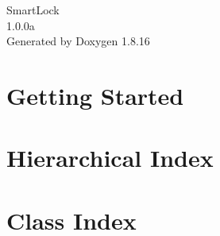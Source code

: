 \let\mypdfximage\pdfximage\def\pdfximage{\immediate\mypdfximage}\documentclass[twoside]{book}
\newcommand{\+}{\discretionary{\mbox{\scriptsize$\hookleftarrow$}}{}{}}
\newcommand{\clearemptydoublepage}{%
  \newpage{\pagestyle{empty}\cleardoublepage}%
}
\begin{document}
\hypersetup{pageanchor=false,
             bookmarksnumbered=true,
             pdfencoding=unicode
            }
\begin{titlepage}
\vspace*{7cm}
\begin{center}%
{\Large Smart\+Lock \\[1ex]\large 1.\+0.\+0a }\\
\vspace*{1cm}
{\large Generated by Doxygen 1.8.16}\\
\end{center}
\end{titlepage}
\clearemptydoublepage
{}
\tableofcontents
\clearemptydoublepage
{}
\hypersetup{pageanchor=true}

\chapter{Getting Started}
\label{md_server__h_e_l_p}

\chapter{Hierarchical Index}

\chapter{Class Index}

\end{document}
